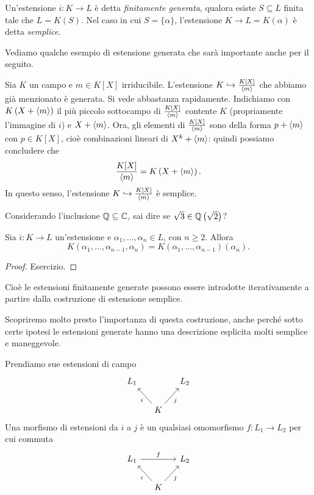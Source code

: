 \begin{defi}
Un'estensione $i : K \to L$ è detta {\em finitamente generata}, qualora esiste $S \subseteq L$ finita tale che $L = K(S)$. Nel caso in cui $S = \{\alpha\}$, l'estensione $K \to L = K(\alpha)$ è detta {\em semplice}.
\end{defi}

Vediamo qualche esempio di estensione generata che sarà importante anche per il seguito.

\begin{esem}
Sia $K$ un campo e $m \in K[X]$ irriducibile. L'estensione $K \hookrightarrow \frac{K[X]}{\left\langle m\right\rangle}$ che abbiamo già menzionato è generata. Si vede abbastanza rapidamente. Indichiamo con $K\left(X + \left\langle m\right\rangle\right)$ il più piccolo sottocampo di $\frac{K[X]}{\left\langle m\right\rangle}$ contente $K$ (propriamente l'immagine di $i$) e $X + \left\langle m\right\rangle$. Ora, gli elementi di $\frac{K[X]}{\left\langle m\right\rangle}$ sono della forma $p + \left\langle m\right\rangle$ con $p \in K[X]$, cioè combinazioni lineari di $X^k +\left\langle m\right\rangle$: quindi possiamo concludere che
\[\frac{K[X]}{\left\langle m\right\rangle} = K\left(X + \left\langle m\right\rangle\right) .\]
In questo senso, l'estensione $K \hookrightarrow \frac{K[X]}{\left\langle m\right\rangle}$ è semplice.
\end{esem}

\begin{eser}
Considerando l'inclusione $\mathbb{Q} \subseteq \mathbb{C}$, sai dire se $\sqrt3 \in \mathbb{Q}\left(\sqrt2\right)$?
\end{eser}

\begin{prop}
Sia $i : K \to L$ un'estensione e $\alpha_1, \dots{}, \alpha_n \in L$, con $n \ge 2$. Allora
\[K\left(\alpha_1, \dots{}, \alpha_{n-1}, \alpha_n\right) = K\left(\alpha_1, \dots{}, \alpha_{n-1}\right)\left(\alpha_n\right). \]
\end{prop}

\begin{proof}
Esercizio.
\end{proof}

Cioè le estensioni finitamente generate possono essere introdotte iterativamente a partire dalla costruzione di estensione semplice.

Scopriremo molto presto l'importanza di questa costruzione, anche perché sotto certe ipotesi le estensioni generate hanno una descrizione esplicita molti semplice e maneggevole. 

\begin{defi}
Prendiamo sue estensioni di campo
\[\begin{tikzcd}[column sep=small]
L_1 & & L_2 \\
& K \ar["i", ul] \ar["j", ur, swap] &
\end{tikzcd}\]
Una morfismo di estensioni da $i$ a $j$ è un qualsiasi omomorfismo $f : L_1 \to L_2$ per cui commuta
\[\begin{tikzcd}[column sep=small]
L_1 \ar["f", rr] & & L_2 \\
& K \ar["i", ul] \ar["j", ur, swap] &
\end{tikzcd}\] 
\end{defi}


